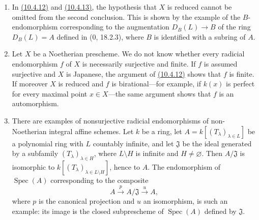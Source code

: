 \begin{remark}[10.4.14]
\label{IV.10.4.14}
\begin{enumerate}[label=\textup{(\roman*)}]
\item In {\hyperref[IV.10.4.12]{(10.4.12)}} and {\hyperref[IV.10.4.13]{(10.4.13)}}, the hypothesis that $X$ is reduced
cannot be omitted from the second conclusion.  This is shown by the
example of the $B$-endomorphism corresponding to the augmentation
$D_B(L)\to B$ of the ring $D_B(L)=A$ defined in (0, 18.2.3), where $B$
is identified with a subring of $A$.

\item Let $X$ be a Noetherian prescheme.  We do not know whether every
radicial endomorphism $f$ of $X$ is necessarily surjective and finite.
If $f$ is assumed surjective and $X$ is Japanese, the argument of
{\hyperref[IV.10.4.12]{(10.4.12)}} shows that $f$ is finite.  If moreover $X$ is reduced and
$f$ is birational---for example, if $k(x)$ is perfect for every maximal
point $x\in X$---the same argument shows that $f$ is an automorphism.

\item There are examples of nonsurjective radicial endomorphisms of
non-Noetherian integral affine schemes.  Let $k$ be a ring, let
$A=k[(T_\lambda)_{\lambda\in L}]$ be a polynomial ring with $L$
countably infinite, and let $\mathfrak J$ be the ideal generated by a
subfamily $(T_\lambda)_{\lambda\in H}$, where $L\setminus H$ is infinite
and $H\neq\varnothing$.  Then $A/\mathfrak J$ is isomorphic to
$k[(T_\lambda)_{\lambda\in L\setminus H}]$, hence to $A$.  The
endomorphism of $\operatorname{Spec}(A)$ corresponding to the composite
\[
 A\xrightarrow{p}A/\mathfrak J\xrightarrow{u}A,
\]
where $p$ is the canonical projection and $u$ an isomorphism, is such
an example: its image is the closed subprescheme of
$\operatorname{Spec}(A)$ defined by $\mathfrak J$.
\end{enumerate}
\end{remark}

\EGAIVErrataThirtyTwoThroughFiftyThree

